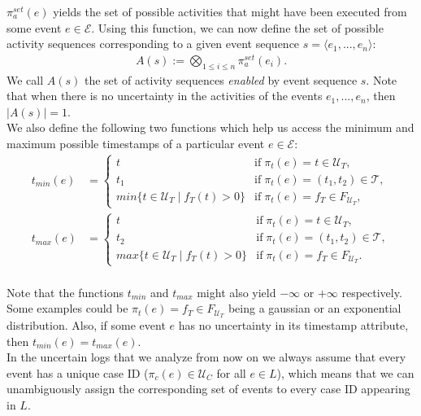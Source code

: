 $\pi_a^{set}(e)$ yields the set of possible activities that might have been executed from some event $e \in \mathcal{E}$.
Using this function, we can now define the set of possible activity sequences corresponding to a given event sequence $s = \langle e_1,...,e_n \rangle$:
\begin{align*}\label{def: cartesian activities}
A(s) := \bigotimes_{1 \leq i \leq n} \pi^{set}_a(e_i). 
\end{align*}
We call $A(s)$ the set of activity sequences \textit{enabled} by event sequence $s$.
Note that when there is no uncertainty in the activities of the events $e_1,...,e_n$, then $|A(s)|=1$.\\
We also define the following two functions which help us access the minimum and maximum possible timestamps of a particular event $e \in \mathcal{E}$:
\begin{align*}
t_{min}(e) &= \begin{cases}
	t & \mbox{if} \; \pi_t(e)=t \in \mathcal{U}_T,\\
	t_1 & \mbox{if} \; \pi_t(e)=(t_1,t_2) \in \mathcal{T}, \\
	min \{t \in \mathcal{U}_T \mid f_T(t) > 0 \} & \mbox{if} \; \pi_t(e) = f_T \in F_{\mathcal{U}_T},
	\end{cases} \\
t_{max}(e) &= \begin{cases}
	t & \mbox{if} \; \pi_t(e)=t \in \mathcal{U}_T,\\
	t_2 & \mbox{if} \; \pi_t(e)=(t_1,t_2) \in \mathcal{T}, \\
	max \{t \in \mathcal{U}_T \mid f_T(t) > 0 \} & \mbox{if} \; \pi_t(e) = f_T \in F_{\mathcal{U}_T}.
	\end{cases} \\
\end{align*}

Note that the functions $t_{min}$ and $t_{max}$ might also yield $- \infty$ or $+\infty$ respectively. 
Some examples could be $\pi_t(e)=f_T \in F_{\mathcal{U}_T}$ being a gaussian or an exponential distribution.
Also, if some event $e$ has no uncertainty in its timestamp attribute, then $t_{min}(e) = t_{max}(e)$.\\

In the uncertain logs that we analyze from now on we always assume that every event has a unique case ID ($\pi_c(e) \in \mathcal{U}_C$ for all $e \in L$), which means that we can unambiguously assign the corresponding set of events to every case ID appearing in $L$.

